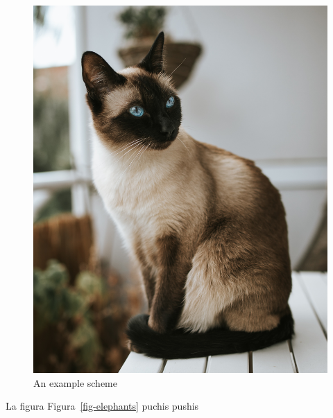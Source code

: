 \documentclass[
  12pt,
  letterpaper,
  DIV=11,
  numbers=noendperiod,
  oneside]{scrreport}
\begin{document}
\begin{figure}

{\centering \includegraphics{./imagenes/gato_siames.jpg}

}

\caption{\label{fig-el_gato}An example scheme}

\end{figure}

La figura Figura~\ref{fig-elephants} puchis pushis
\end{document}
